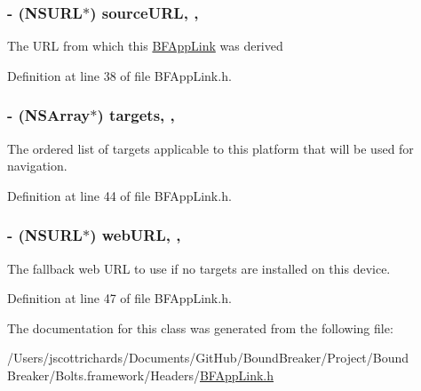 \subsubsection[{source\+U\+R\+L}]{\setlength{\rightskip}{0pt plus 5cm}-\/ (N\+S\+U\+R\+L$\ast$) source\+U\+R\+L\hspace{0.3cm}{\ttfamily [read]}, {\ttfamily [nonatomic]}, {\ttfamily [strong]}}\label{interface_b_f_app_link_a4db7f973d6e7e0eab7357b3e1088a84b}
The U\+R\+L from which this \hyperlink{interface_b_f_app_link}{B\+F\+App\+Link} was derived 

Definition at line 38 of file B\+F\+App\+Link.\+h.

\hypertarget{interface_b_f_app_link_a6030f56ee163277ec6bbc6c1d1622dcf}{}
\subsubsection[{targets}]{\setlength{\rightskip}{0pt plus 5cm}-\/ (N\+S\+Array$\ast$) targets\hspace{0.3cm}{\ttfamily [read]}, {\ttfamily [nonatomic]}, {\ttfamily [copy]}}\label{interface_b_f_app_link_a6030f56ee163277ec6bbc6c1d1622dcf}
The ordered list of targets applicable to this platform that will be used for navigation. 

Definition at line 44 of file B\+F\+App\+Link.\+h.

\hypertarget{interface_b_f_app_link_a427314607aa703c9e4213385e20b5d48}{}
\subsubsection[{web\+U\+R\+L}]{\setlength{\rightskip}{0pt plus 5cm}-\/ (N\+S\+U\+R\+L$\ast$) web\+U\+R\+L\hspace{0.3cm}{\ttfamily [read]}, {\ttfamily [nonatomic]}, {\ttfamily [strong]}}\label{interface_b_f_app_link_a427314607aa703c9e4213385e20b5d48}
The fallback web U\+R\+L to use if no targets are installed on this device. 

Definition at line 47 of file B\+F\+App\+Link.\+h.



The documentation for this class was generated from the following file\+:\begin{DoxyCompactItemize}
\item 
/\+Users/jscottrichards/\+Documents/\+Git\+Hub/\+Bound\+Breaker/\+Project/\+Bound Breaker/\+Bolts.\+framework/\+Headers/\hyperlink{_b_f_app_link_8h}{B\+F\+App\+Link.\+h}\end{DoxyCompactItemize}
